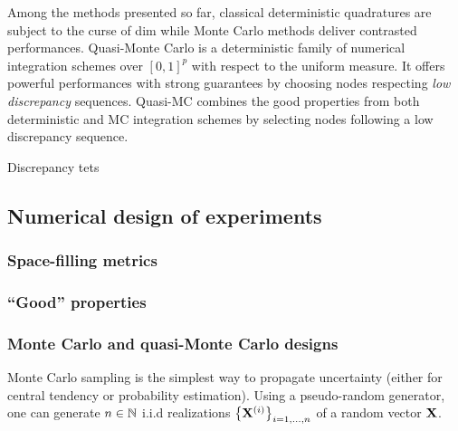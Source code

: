 Among the methods presented so far, classical deterministic quadratures are subject to the curse of dim while Monte Carlo methods deliver contrasted performances. 
Quasi-Monte Carlo is a deterministic family of numerical integration schemes over $[0, 1]^p$ with respect to the uniform measure. 
It offers powerful performances with strong guarantees by choosing nodes respecting \textit{low discrepancy} sequences.
Quasi-MC combines the good properties from both deterministic and MC integration schemes by selecting nodes following a low discrepancy sequence.

\begin{definition}{Discrepancy}
    tets
\end{definition} 


\subsection{Numerical design of experiments}
\subsubsection{Space-filling metrics}

\subsubsection{``Good'' properties}

\subsubsection{Monte Carlo and quasi-Monte Carlo designs}

Monte Carlo sampling is the simplest way to propagate uncertainty (either for central tendency or probability estimation). 
Using a pseudo-random generator, one can generate $n \in \mathbb{N}$ i.i.d realizations $\left\{{\bf X}^{(i)}\right\}_{i=1,...,n}$ of a random vector ${\bf X}$.

